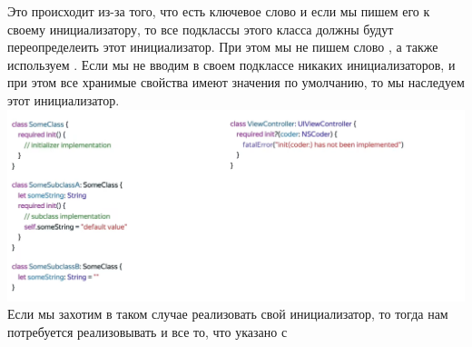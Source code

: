 \documentclass{article}
\begin{document}
    \newline
    Это происходит из-за того, что есть ключевое слово  и если мы пишем его к своему инициализатору, то все подклассы этого класса должны будут переопределеить этот инициализатор. 
    \newline
    При этом мы не пишем слово , а также используем . 
    \newline
    Если мы не вводим в своем подклассе никаких инициализаторов, и при этом все хранимые свойства имеют значения по умолчанию, то мы наследуем этот инициализатор. 
    \newline
    \includegraphics[scale = 0.2]{pic/requiredInitSwiftAdv.png}
    \newline
    Если мы захотим в таком случае реализовать свой инициализатор, то тогда нам потребуется реализовывать и все то, что указано с 
\end{document}
